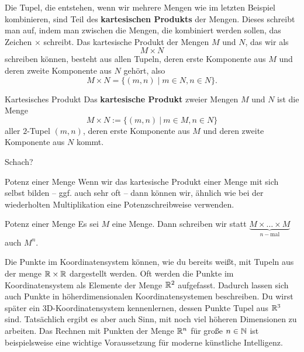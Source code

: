 \documentclass[../../main.tex]{subfiles}
\begin{document}
\begin{example}{}
\end{example}

Die Tupel, die entstehen, wenn wir mehrere Mengen wie im letzten Beispiel kombinieren, sind Teil des \textbf{kartesischen Produkts} der Mengen. Dieses schreibt man auf, indem man zwischen die Mengen, die kombiniert werden sollen, das Zeichen $\times$ schreibt. Das kartesische Produkt der Mengen $M$ und $N$, das wir als 
\[M \times N\]
schreiben können, besteht aus allen Tupeln, deren erste Komponente aus $M$ und deren zweite Komponente aus $N$ gehört, also
\[M \times N=\{(m,n) \mid m\in N, n\in N\}.\]

\begin{definition}{Kartesisches Produkt}
    Das \textbf{kartesische Produkt} zweier Mengen $M$ und $N$ ist die Menge
    \[M\times N:=\{(m,n)~|~m\in M, n\in N\}\]
    aller $2$-Tupel $(m,n)$, deren erste Komponente aus $M$ und deren zweite Komponente aus $N$ kommt.
\end{definition}

\begin{example}{}
    Schach?
\end{example}

\begin{advanced}{Potenz einer Menge}
    Wenn wir das kartesische Produkt einer Menge mit sich selbst bilden -- ggf. auch sehr oft -- dann können wir, ähnlich wie bei der wiederholten Multiplikation eine Potenzschreibweise verwenden.

    \begin{definition}{Potenz einer Menge}
        Es sei $M$ eine Menge. Dann schreiben wir statt $\underbrace{M\times \dots\times M}_{n-\text{mal}}$ auch $M^n$.
    \end{definition}

    Die Punkte im Koordinatensystem können, wie du bereits weißt, mit Tupeln aus der menge $\mathbb{R}\times\mathbb{R}$ dargestellt werden. Oft werden die Punkte im Koordinatensystem als Elemente der Menge $\mathbb{R}^2$ aufgefasst. Dadurch lassen sich auch Punkte in höherdimensionalen Koordinatensystemen beschreiben. Du wirst später ein 3D-Koordinatensystem kennenlernen, dessen Punkte Tupel aus $\mathbb{R}^3$ sind. Tatsächlich ergibt es aber auch Sinn, mit noch viel höheren Dimensionen zu arbeiten. Das Rechnen mit Punkten der Menge $\mathbb{R}^n$ für große $n\in\mathbb{N}$ ist beispielsweise eine wichtige Voraussetzung für moderne künstliche Intelligenz.
\end{advanced}
\end{document}
